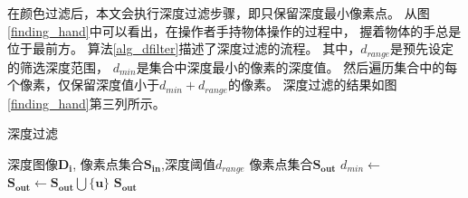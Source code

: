 在颜色过滤后，本文会执行深度过滤步骤，即只保留深度最小像素点。
从图\ref{finding_hand}中可以看出，在操作者手持物体操作的过程中，
握着物体的手总是位于最前方。
算法\ref{alg_dfilter}描述了深度过滤的流程。
其中，$d_{range}$是预先设定的筛选深度范围，%
$d_{min}$是集合中深度最小的像素的深度值。
然后遍历集合中的每个像素，仅保留深度值小于$d_{min}+d_{range}$的像素。
深度过滤的结果如图\ref{finding_hand}第三列所示。
\begin{algorithm}
    \fangsong
    \caption{深度过滤}
    \label{alg_dfilter}
    \begin{algorithmic}[1]
        \Require 深度图像$\mathbf{D_i}$, 像素点集合$\mathbf{S_{in}}$,深度阈值$d_{range}$
        \Ensure 像素点集合$\mathbf{S_{out}}$
            \State $d_{min} \gets$ 
                    \State $\mathbf{S_{out}} \gets \mathbf{S_{out}} \bigcup \{\mathbf{u}\}$
                \EndIf
            \EndFor
            \State \Return $\mathbf{S_{out}}$
        \EndFunction
    \end{algorithmic}
\end{algorithm}
